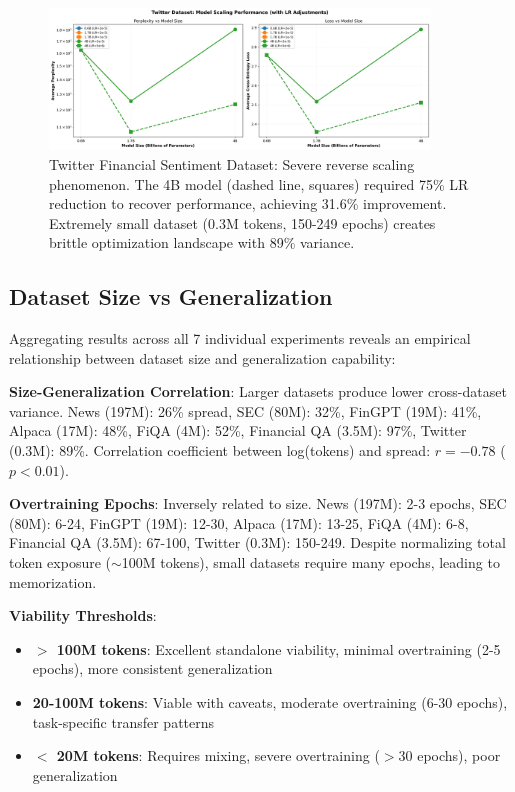 \begin{figure}[h]
\centering
\includegraphics[width=0.9\textwidth]{figures/scaling_twitter.png}
\caption[Twitter Financial Sentiment Dataset: Reverse Scaling]{Twitter Financial Sentiment Dataset: Severe reverse scaling phenomenon. The 4B model (dashed line, squares) required 75\% LR reduction to recover performance, achieving 31.6\% improvement. Extremely small dataset (0.3M tokens, 150-249 epochs) creates brittle optimization landscape with 89\% variance.}
\label{fig:scaling_twitter}
\end{figure}





\subsection{Dataset Size vs Generalization}

Aggregating results across all 7 individual experiments reveals an empirical relationship between dataset size and generalization capability:

\textbf{Size-Generalization Correlation}: Larger datasets produce lower cross-dataset variance. News (197M): 26\% spread, SEC (80M): 32\%, FinGPT (19M): 41\%, Alpaca (17M): 48\%, FiQA (4M): 52\%, Financial QA (3.5M): 97\%, Twitter (0.3M): 89\%. Correlation coefficient between log(tokens) and spread: $r = -0.78$ ($p < 0.01$).

\textbf{Overtraining Epochs}: Inversely related to size. News (197M): 2-3 epochs, SEC (80M): 6-24, FinGPT (19M): 12-30, Alpaca (17M): 13-25, FiQA (4M): 6-8, Financial QA (3.5M): 67-100, Twitter (0.3M): 150-249. Despite normalizing total token exposure ($\sim$100M tokens), small datasets require many epochs, leading to memorization.

\textbf{Viability Thresholds}:
\begin{itemize}
\item \textbf{$>$ 100M tokens}: Excellent standalone viability, minimal overtraining (2-5 epochs), more consistent generalization
\item \textbf{20-100M tokens}: Viable with caveats, moderate overtraining (6-30 epochs), task-specific transfer patterns
\item \textbf{$<$ 20M tokens}: Requires mixing, severe overtraining ($>$30 epochs), poor generalization
\end{itemize}

